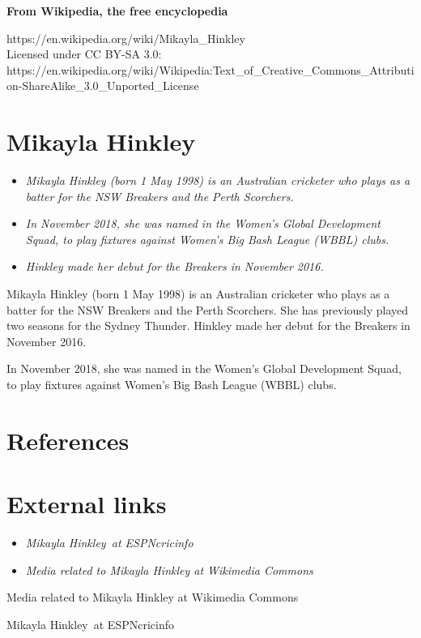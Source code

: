 \textbf{From Wikipedia, the free encyclopedia}

https://en.wikipedia.org/wiki/Mikayla\_Hinkley\\
Licensed under CC BY-SA 3.0:\\
https://en.wikipedia.org/wiki/Wikipedia:Text\_of\_Creative\_Commons\_Attribution-ShareAlike\_3.0\_Unported\_License

\section{Mikayla Hinkley}\label{mikayla-hinkley}

\begin{itemize}
\item
  \emph{Mikayla Hinkley (born 1 May 1998) is an Australian cricketer who
  plays as a batter for the NSW Breakers and the Perth Scorchers.}
\item
  \emph{In November 2018, she was named in the Women's Global
  Development Squad, to play fixtures against Women's Big Bash League
  (WBBL) clubs.}
\item
  \emph{Hinkley made her debut for the Breakers in November 2016.}
\end{itemize}

Mikayla Hinkley (born 1 May 1998) is an Australian cricketer who plays
as a batter for the NSW Breakers and the Perth Scorchers. She has
previously played two seasons for the Sydney Thunder. Hinkley made her
debut for the Breakers in November 2016.

In November 2018, she was named in the Women's Global Development Squad,
to play fixtures against Women's Big Bash League (WBBL) clubs.

\section{References}\label{references}

\section{External links}\label{external-links}

\begin{itemize}
\item
  \emph{Mikayla Hinkley~at ESPNcricinfo}
\item
  \emph{Media related to Mikayla Hinkley at Wikimedia Commons}
\end{itemize}

Media related to Mikayla Hinkley at Wikimedia Commons

Mikayla Hinkley~at ESPNcricinfo
